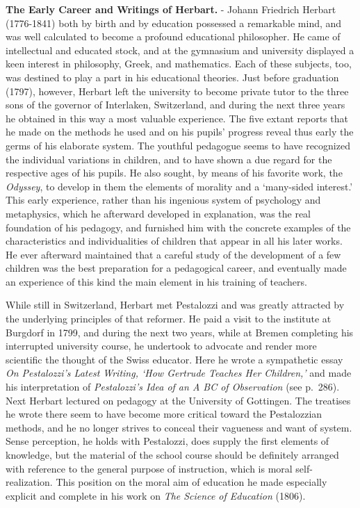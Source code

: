 \documentclass[]{book}
\begin{document}
\textbf{The Early Career and Writings of Herbart.} - Johann Friedrich Herbart (1776-1841) both by birth and by education possessed a remarkable mind, and was well calculated to become a profound educational philosopher. He came of intellectual and educated stock, and at the gymnasium and university displayed a keen interest in philosophy, Greek, and mathematics. Each of these subjects, too, was destined to play a part in his educational theories. Just before graduation (1797), however, Herbart left the university to become private tutor to the three sons of the governor of Interlaken, Switzerland, and during the next three years he obtained in this way a most valuable experience. The five extant reports that he made on the methods he used and on his pupils' progress reveal thus early the germs of his elaborate system. The youthful pedagogue seems to have recognized the individual variations in children, and to have shown a due regard for the respective ages of his pupils. He also sought, by means of his favorite work, the \emph{Odyssey}, to develop in them the elements of morality and a `many-sided interest.' This early experience, rather than his ingenious system of psychology and metaphysics, which he afterward developed in explanation, was the real foundation of his pedagogy, and furnished him with the concrete examples of the characteristics and individualities of children that appear in all his later works. He ever afterward maintained that a careful study of the development of a few children was the best preparation for a pedagogical career, and eventually made an experience of this kind the main element in his training of teachers.

While still in Switzerland, Herbart met Pestalozzi and was greatly attracted by the underlying principles of that reformer. He paid a visit to the institute at Burgdorf in 1799, and during the next two years, while at Bremen completing his interrupted university course, he undertook to advocate and render more scientific the thought of the Swiss educator. Here he wrote a sympathetic essay \emph{On Pestalozzi's Latest Writing, `How Gertrude Teaches Her Children,'} and made his interpretation of \emph{Pestalozzi's Idea of an A BC of Observation} (see p.~286). Next Herbart lectured on pedagogy at the University of Gottingen. The treatises he wrote there seem to have become more critical toward the Pestalozzian methods, and he no longer strives to conceal their vagueness and want of system. Sense perception, he holds with Pestalozzi, does supply the first elements of knowledge, but the material of the school course should be definitely arranged with reference to the general purpose of instruction, which is moral self-realization. This position on the moral aim of education he made especially explicit and complete in his work on \emph{The Science of Education} (1806).
\end{document}
